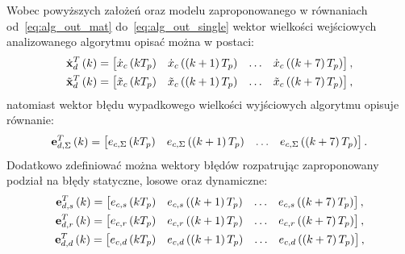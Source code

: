 Wobec powyższych założeń oraz modelu zaproponowanego w równaniach od~\eqref{eq:alg_out_mat} do~\eqref{eq:alg_out_single} wektor wielkości wejściowych analizowanego algorytmu opisać można w postaci:
\begin{gather}
\dot{\mathbf{x}}_{d}^{T} \left(k\right) =
\begin{bmatrix}
\dot{x}_{c} \left(kT_{p}\right) & \dot{x}_{c} \left( \left(k+1\right) T_{p} \right) & \hdots & \dot{x}_{c} \left( \left(k+7\right) T_{p} \right)
\end{bmatrix}
\label{eq:sym_partd_input_ideal}, \\
\tilde{\mathbf{x}}_{d}^{T} \left(k\right) =
\begin{bmatrix}
\tilde{x}_{c} \left(kT_{p}\right) & \tilde{x}_{c} \left( \left(k+1\right) T_{p} \right) & \hdots & \tilde{x}_{c} \left( \left(k+7\right) T_{p} \right)
\end{bmatrix}
\label{eq:sym_partd_input_real},
\end{gather}
natomiast wektor błędu wypadkowego wielkości wyjściowych algorytmu opisuje równanie:
\begin{equation}
\mathbf{e}_{d,\Sigma}^{T} \left(k\right) =
\begin{bmatrix}
e_{c,\Sigma} \left(kT_{p}\right) & e_{c,\Sigma} \left( \left(k+1\right) T_{p} \right) & \hdots & e_{c,\Sigma} \left( \left(k+7\right) T_{p} \right)
\end{bmatrix}
\label{eq:sym_partd_input_error_sum}.
\end{equation}
Dodatkowo zdefiniować można wektory błędów rozpatrując zaproponowany podział na błędy statyczne, losowe oraz dynamiczne:
\begin{gather}
\mathbf{e}_{d,s}^{T} \left(k\right) =
\begin{bmatrix}
e_{c,s} \left(kT_{p}\right) & e_{c,s} \left( \left(k+1\right) T_{p} \right) & \hdots & e_{c,s} \left( \left(k+7\right) T_{p} \right)
\end{bmatrix}
\label{eq:sym_partd_input_error_stat}, \\
\mathbf{e}_{d,r}^{T} \left(k\right) =
\begin{bmatrix}
e_{c,r} \left(kT_{p}\right) & e_{c,r} \left( \left(k+1\right) T_{p} \right) & \hdots & e_{c,r} \left( \left(k+7\right) T_{p} \right)
\end{bmatrix}
\label{eq:sym_partd_input_error_rand}, \\
\mathbf{e}_{d,d}^{T} \left(k\right) =
\begin{bmatrix}
e_{c,d} \left(kT_{p}\right) & e_{c,d} \left( \left(k+1\right) T_{p} \right) & \hdots & e_{c,d} \left( \left(k+7\right) T_{p} \right)
\end{bmatrix}
\label{eq:sym_partd_input_error_dyn},
\end{gather}
